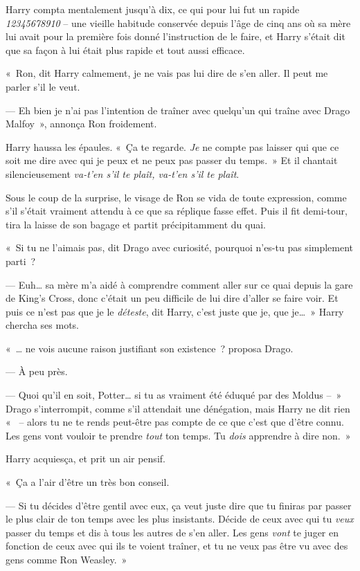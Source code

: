 Harry compta mentalement jusqu'à dix, ce qui pour lui fut un rapide \emph{12345678910} -- une vieille habitude conservée depuis l'âge de cinq ans où sa mère lui avait pour la première fois donné l'instruction de le faire, et Harry s'était dit que sa façon à lui était plus rapide et tout aussi efficace.

«~Ron, dit Harry calmement, je ne vais pas lui dire de s'en aller. Il peut me parler s'il le veut.

--- Eh bien je n'ai pas l'intention de traîner avec quelqu'un qui traîne avec Drago Malfoy~», annonça Ron froidement.

Harry haussa les épaules. «~Ça te regarde. \emph{Je} ne compte pas laisser qui que ce soit me dire avec qui je peux et ne peux pas passer du temps.~» Et il chantait silencieusement \emph{va-t'en s'il te plaît, va-t'en s'il te plaît}.

Sous le coup de la surprise, le visage de Ron se vida de toute expression, comme s'il s'était vraiment attendu à ce que sa réplique fasse effet. Puis il fit demi-tour, tira la laisse de son bagage et partit précipitamment du quai.

«~Si tu ne l'aimais pas, dit Drago avec curiosité, pourquoi n'es-tu pas simplement parti~?

--- Euh… sa mère m'a aidé à comprendre comment aller sur ce quai depuis la gare de King's Cross, donc c'était un peu difficile de lui dire d'aller se faire voir. Et puis ce n'est pas que je le \emph{déteste}, dit Harry, c'est juste que je, que je…~» Harry chercha ses mots.

«~… ne vois aucune raison justifiant son existence~? proposa Drago.

--- À peu près.

--- Quoi qu'il en soit, Potter… si tu as vraiment été éduqué par des Moldus --~» Drago s'interrompit, comme s'il attendait une dénégation, mais Harry ne dit rien «~ -- alors tu ne te rends peut-être pas compte de ce que c'est que d'être connu. Les gens vont vouloir te prendre \emph{tout} ton temps. Tu \emph{dois} apprendre à dire non.~»

Harry acquiesça, et prit un air pensif.

«~Ça a l'air d'être un très bon conseil.

--- Si tu décides d'être gentil avec eux, ça veut juste dire que tu finiras par passer le plus clair de ton temps avec les plus insistants. Décide de ceux avec qui tu \emph{veux} passer du temps et dis à tous les autres de s'en aller. Les gens \emph{vont} te juger en fonction de ceux avec qui ils te voient traîner, et tu ne veux pas être vu avec des gens comme Ron Weasley.~»

